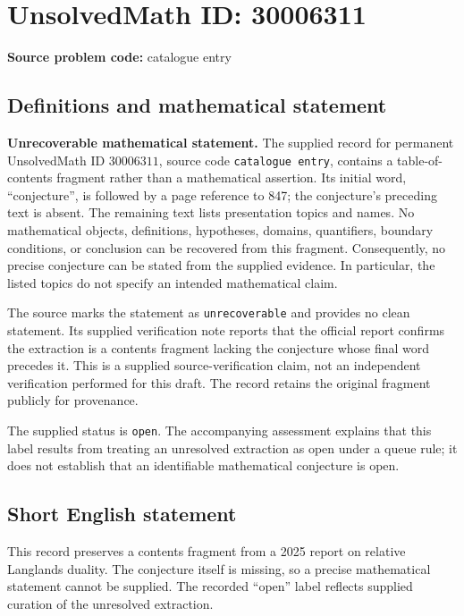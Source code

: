 \documentclass[11pt]{article}
\begin{document}
\section*{UnsolvedMath ID: 30006311}
\textbf{Source problem code:} catalogue entry
\subsection{Definitions and mathematical statement}
\textbf{Unrecoverable mathematical statement.} The supplied record for permanent UnsolvedMath ID \(30006311\), source code \texttt{catalogue entry}, contains a table-of-contents fragment rather than a mathematical assertion. Its initial word, ``conjecture'', is followed by a page reference to 847; the conjecture's preceding text is absent. The remaining text lists presentation topics and names. No mathematical objects, definitions, hypotheses, domains, quantifiers, boundary conditions, or conclusion can be recovered from this fragment. Consequently, no precise conjecture can be stated from the supplied evidence. In particular, the listed topics do not specify an intended mathematical claim.

The source marks the statement as \texttt{unrecoverable} and provides no clean statement. Its supplied verification note reports that the official report confirms the extraction is a contents fragment lacking the conjecture whose final word precedes it. This is a supplied source-verification claim, not an independent verification performed for this draft. The record retains the original fragment publicly for provenance.

The supplied status is \texttt{open}. The accompanying assessment explains that this label results from treating an unresolved extraction as open under a queue rule; it does not establish that an identifiable mathematical conjecture is open.
\subsection{Short English statement}
This record preserves a contents fragment from a 2025 report on relative Langlands duality. The conjecture itself is missing, so a precise mathematical statement cannot be supplied. The recorded ``open'' label reflects supplied curation of the unresolved extraction.
\end{document}
